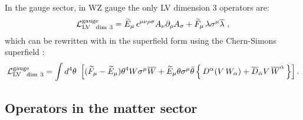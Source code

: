 \documentclass[12pt]{revtex4}
\begin{document}
In the gauge sector, in WZ gauge the only LV dimension 3 
operators are:
\begin{eqnarray}
{\cal L}_{\rm LV ~ ~dim~3}^{\rm gauge} =
\widetilde{E}_\mu\, \epsilon^{\mu\nu\rho\sigma}
A_\nu \partial_\rho A_\sigma  +
\widetilde{F}_\mu\, \lambda \sigma^\mu \overline{\lambda} 
~,
\end{eqnarray}
which can be rewritten with in the superfield form using the Chern-Simons superfield
\cite{Cecotti:1987nw}:
\begin{eqnarray*}
\label{CSint}
{\cal L}_{\rm LV ~ ~dim~3}^{\rm gauge} = \int d^4\theta~ 
\left[(\widetilde{F}_\mu -  \widetilde{E}_\mu)\theta^4 W \sigma^\mu \overline{W} 
+\widetilde{E}_\mu\theta \sigma^\mu\bar\theta \left\{\, 
D^\alpha (V\, W_\alpha) 
+
\overline{D}_{\dot\alpha}V\,
\overline{W}^{\dot\alpha}
\,
\right\}\right].
\end{eqnarray*}

\subsection{Operators in the matter sector}
\end{document}
